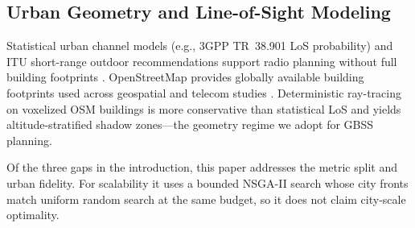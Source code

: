 \subsection{Urban Geometry and Line-of-Sight Modeling}

Statistical urban channel models (e.g., 3GPP TR~38.901 LoS probability) and ITU short-range outdoor recommendations support radio planning without full building footprints \cite{3gpp38901,itur_p1411}. OpenStreetMap provides globally available building footprints used across geospatial and telecom studies \cite{osm_applications,elias2023exploring}. Deterministic ray-tracing on voxelized OSM buildings is more conservative than statistical LoS and yields altitude-stratified shadow zones---the geometry regime we adopt for GBSS planning.

Of the three gaps in the introduction, this paper addresses the metric split and urban fidelity. For scalability it uses a bounded NSGA-II search whose city fronts match uniform random search at the same budget, so it does not claim city-scale optimality.
